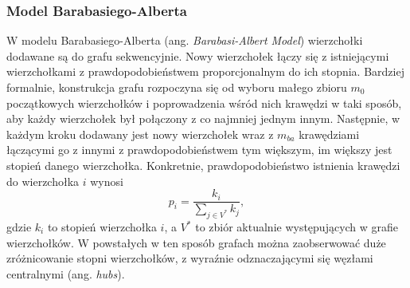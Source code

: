     \subsubsection{Model Barabasiego-Alberta}
    W modelu Barabasiego-Alberta (ang. \textit{Barabasi-Albert Model}) wierzchołki dodawane są do grafu sekwencyjnie. Nowy wierzchołek łączy się z istniejącymi wierzchołkami z prawdopodobieństwem proporcjonalnym do ich stopnia. Bardziej formalnie, konstrukcja grafu rozpoczyna się od wyboru małego zbioru $m_0$ początkowych wierzchołków i poprowadzenia wśród nich krawędzi w taki sposób, aby każdy wierzchołek był połączony z co najmniej jednym innym. Następnie, w każdym kroku dodawany jest nowy wierzchołek wraz z $m_{ba}$ krawędziami łączącymi go z innymi z prawdopodobieństwem tym większym, im większy jest stopień danego wierzchołka. Konkretnie, prawdopodobieństwo istnienia krawędzi do wierzchołka $i$ wynosi 
    \[
        p_i = \frac{k_i}{\sum_{j \in V^{*}} k_j},
    \]
    gdzie $k_i$ to stopień wierzchołka $i$, a $V^{*}$ to zbiór aktualnie występujących w grafie wierzchołków. W powstałych w ten sposób grafach można zaobserwować duże zróżnicowanie stopni wierzchołków, z wyraźnie odznaczającymi się węzłami centralnymi (ang. \textit{hubs}).

